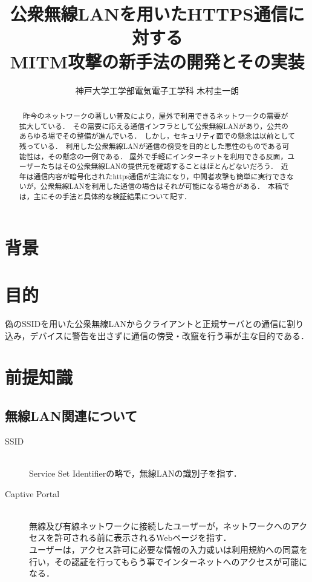 \documentclass[dvipdfmx]{jsarticle}
\title{公衆無線LANを用いたHTTPS通信に対する\\MITM攻撃の新手法の開発とその実装}
\author{神戸大学工学部電気電子工学科 木村圭一朗}
\begin{document}
    \maketitle
    \begin{abstract}
        \ 昨今のネットワークの著しい普及により，屋外で利用できるネットワークの需要が拡大している．\
        その需要に応える通信インフラとして公衆無線LANがあり，公共のあらゆる場でその整備が進んでいる．\
        しかし，セキュリティ面での懸念は以前として残っている．\
        利用した公衆無線LANが通信の傍受を目的とした悪性のものである可能性は，その懸念の一例である．
        屋外で手軽にインターネットを利用できる反面，ユーザーたちはその公衆無線LANの提供元を確認することはほとんどないだろう．\
        近年は通信内容が暗号化されたhttps通信が主流になり，中間者攻撃も簡単に実行できないが，公衆無線LANを利用した通信の場合はそれが可能になる場合がある．\
        本稿では，主にその手法と具体的な検証結果について記す．
        \newline
    \end{abstract}
    \tableofcontents
    \clearpage
    \section{背景}
    
    \section{目的}
    偽のSSIDを用いた公衆無線LANからクライアントと正規サーバとの通信に割り込み，デバイスに警告を出さずに通信の傍受・改竄を行う事が主な目的である．
    \section{前提知識}
    \subsection{無線LAN関連について}
    \begin{description}
        \item [SSID]\mbox{}\\
            Service Set Identifierの略で，無線LANの識別子を指す．
        \item [Captive Portal]\mbox{}\\
            無線及び有線ネットワークに接続したユーザーが，ネットワークへのアクセスを許可される前に表示されるWebページを指す．\\
            ユーザーは，アクセス許可に必要な情報の入力或いは利用規約への同意を行い，その認証を行ってもらう事でインターネットへのアクセスが可能になる．
    \end{description}
\end{document}
